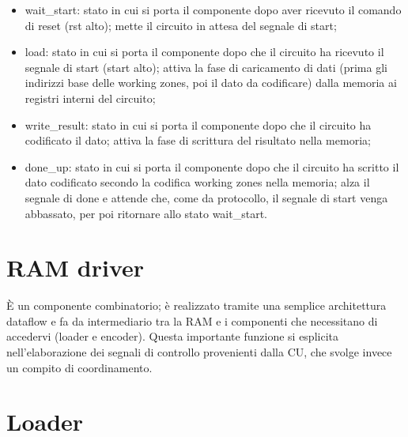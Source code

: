 \documentclass[10pt,english, openany]{book}
\begin{document}
\begin{itemize}
  \item wait\_start: stato in cui si porta il componente dopo aver ricevuto il        comando di reset (rst alto); mette il circuito in attesa del segnale di       start;
  \item load: stato in cui si porta il componente dopo che il circuito ha             ricevuto il segnale di start (start alto); attiva la fase di caricamento       di dati (prima gli indirizzi base delle working zones, poi il dato da         codificare) dalla memoria ai registri interni del circuito;
  \item write\_result: stato in cui si porta il componente dopo che il circuito       ha codificato il dato; attiva la fase di scrittura del risultato nella        memoria;
  \item done\_up: stato in cui si porta il componente dopo che il circuito ha         scritto il dato codificato secondo la codifica working zones nella            memoria; alza il segnale di done e attende che, come da protocollo, il        segnale di start venga abbassato, per poi ritornare allo stato                wait\_start.
\end{itemize}

\section{RAM driver}

È un componente combinatorio; è realizzato tramite una semplice architettura dataflow e fa da intermediario tra la RAM e i componenti che necessitano di accedervi (loader e encoder). Questa importante funzione si esplicita nell’elaborazione dei segnali di controllo provenienti dalla CU, che svolge invece un compito di coordinamento.

\section{Loader}
\end{document}

